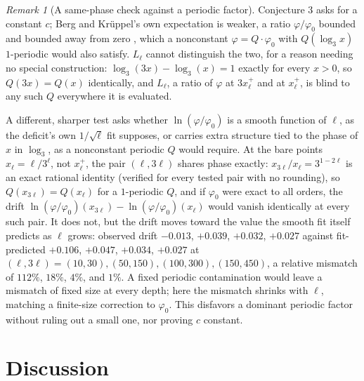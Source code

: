 \documentclass[11pt]{article}
\theoremstyle{remark}
\newtheorem{remark}[theorem]{Remark}
\begin{document}
\begin{remark}[A same-phase check against a periodic factor]
\label{rem:phase-check}
Conjecture 3 asks for a constant $c$; Berg and Kr\"uppel's own
expectation is weaker, a ratio $\varphi/\varphi_0$ bounded and bounded
away from zero \cite[\S9]{BergKruppel1998}, which a nonconstant
$\varphi=Q\cdot\varphi_0$ with $Q(\log_3x)$ $1$-periodic would also
satisfy. $L_\ell$ cannot distinguish the two, for a reason needing no
special construction: $\log_3(3x)-\log_3(x)=1$ exactly for every
$x>0$, so $Q(3x)=Q(x)$ identically, and $L_\ell$, a ratio of $\varphi$
at $3x_\ell^+$ and at $x_\ell^+$, is blind to any such $Q$ everywhere
it is evaluated.

A different, sharper test asks whether $\ln(\varphi/\varphi_0)$ is a
smooth function of $\ell$, as the deficit's own $1/\sqrt\ell$ fit
supposes, or carries extra structure tied to the phase of $x$ in
$\log_3$, as a nonconstant periodic $Q$ would require. At the
bare points $x_\ell=\ell/3^\ell$, not $x_\ell^+$, the pair
$(\ell,3\ell)$ shares phase exactly: $x_{3\ell}/x_\ell=3^{1-2\ell}$ is
an exact rational identity (verified for every tested pair with no
rounding), so $Q(x_{3\ell})=Q(x_\ell)$ for a $1$-periodic $Q$, and if
$\varphi_0$ were exact to all orders, the drift
$\ln(\varphi/\varphi_0)(x_{3\ell})-\ln(\varphi/\varphi_0)(x_\ell)$
would vanish identically at every such pair. It does not, but the
drift moves toward the value the smooth fit itself predicts as
$\ell$ grows: observed drift $-0.013$, $+0.039$, $+0.032$, $+0.027$
against fit-predicted $+0.106$, $+0.047$, $+0.034$, $+0.027$ at
$(\ell,3\ell)=(10,30),(50,150),(100,300),(150,450)$, a relative
mismatch of $112\%$, $18\%$, $4\%$, and $1\%$. A fixed periodic
contamination would leave a mismatch of fixed size at every depth;
here the mismatch shrinks with $\ell$, matching a finite-size
correction to $\varphi_0$. This disfavors a dominant periodic factor
without ruling out a small one, nor proving $c$ constant.
\end{remark}

\section{Discussion}
\label{sec:discussion}
\end{document}
